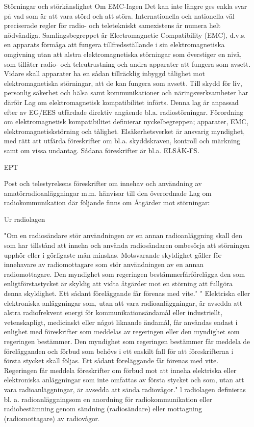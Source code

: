 \documentclass[a4paper,twoside,twocolumn,openright]{book}
\begin{document}
{{{{{Störningar och störkänslighet
Om EMC-Iagen
Det kan inte längre ges enkla svar på vad
som är att vara störd och att störa. Internationella och nationella väl preciserade regler
för radio- och teletekniskt samexistens är
numera helt nödvändiga.
Samlingsbegreppet är Electromagnetic
Compatibility (EMC), d.v.s. en apparats förmåga att fungera tillfredsställande i sin elektromagnetiska omgivning utan att alstra elektromagnetiska störningar som överstiger en
nivå, som tillåter radio- och teleutrustning
och andra apparater att fungera som avsett.
Vidare skall apparater ha en sådan tillräcklig
inbyggd tålighet mot elektromagnetiska störningar, att de kan fungera som avsett.
Till skydd för liv, personlig säkerhet och
hälsa samt kommunikationer och näringsverksamheter har därför Lag om elektromagnetisk kompatibilitet införts. Denna lag
är anpassad efter av EG/EES utfärdade
direktiv angående bl.a. radiostörningar.
Förordning om elektromagnetisk kompatibilitet definierar nyckelbegreppen; apparater, EMC, elektromagnetiskstörning och
tålighet. Elsäkerhetsverket är ansvarig myndighet, med rätt att utfärda föreskrifter om
bl.a. skyddskraven, kontroll och märkning
samt om vissa undantag. Sådana föreskrifter är bl.a. ELSÄK-FS.

EPT

Post och telestyrelsens föreskrifter om innehav och användning av amatörradioanläggningar m.m. hänvisar till den överordnade Lag om radiokommunikation där följande finns om Åtgärder mot störningar:

Ur radiolagen

"Om en radiosändare stör användningen av
en annan radioanläggning skall den som har
tillstånd att inneha och använda radiosändaren ombesörja att störningen upphör eller i
görligaste mån minskas. Motsvarande skyldighet gäller för innehavare av radiomottagare som stör användningen av en annan
radiomottagare.
Den myndighet som regeringen bestämmerfårförelägga den som enligtförstastycket
är skyldig att vidta åtgärder mot en störning
att fullgöra denna skyldighet. Ett sådant föreläggande får förenas med vite."
" Elektriska eller elektroniska anläggningar
som, utan att vara radioanläggningar, är
avsedda att alstra radiofrekvent energi för
kommunikationsändamål eller industriellt,
vetenskapligt, medicinskt eller något liknande ändamål, får användas endast i enlighet
med föreskrifter som meddelas av regeringen eller den myndighet som regeringen bestämmer.
Den myndighet som regeringen bestämmer får meddela de förelägganden och förbud som behövs i ett enskilt fall för att föreskrifterna i första stycket skall följas. Ett
sådant föreläggande får förenas med vite.
Regeringen får meddela föreskrifter om
förbud mot att inneha elektriska eller elektroniska anläggningar som inte omfattas av
första stycket och som, utan att vara radioanläggningar, är avsedda att sända radiovågor."
l radiolagen definieras bl. a. radioanläggningsom en anordning för radiokommunikation eller radiobestämning genom sändning
(radiosändare) eller mottagning (radiomottagare) av radiovågor.

}}}}}
\end{document}
